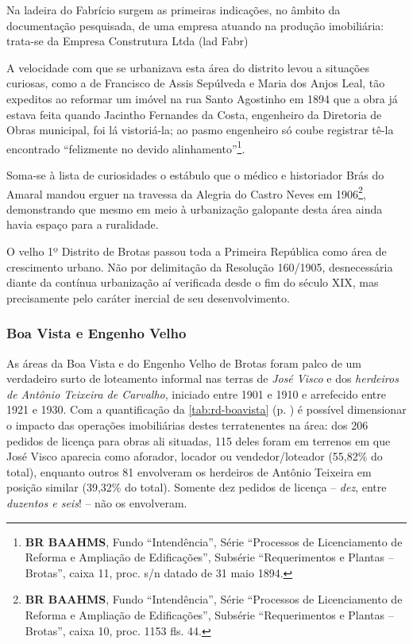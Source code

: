 
Na ladeira do Fabrício surgem as primeiras indicações, no âmbito da documentação pesquisada, de uma empresa atuando na produção imobiliária: trata-se da Empresa Construtura Ltda (lad Fabr)

A velocidade com que se urbanizava esta área do distrito levou a situações curiosas, como a de Francisco de Assis Sepúlveda e Maria dos Anjos Leal, tão expeditos ao reformar um imóvel na rua Santo Agostinho em 1894 que a obra já estava feita quando Jacintho Fernandes da Costa, engenheiro da Diretoria de Obras municipal, foi lá vistoriá-la; ao pasmo engenheiro só coube registrar tê-la encontrado ``felizmente no devido alinhamento''\footnote{\textbf{BR BAAHMS}, Fundo ``Intendência'', Série ``Processos de Licenciamento de Reforma e Ampliação de Edificações'', Subsérie ``Requerimentos e Plantas -- Brotas'', caixa 11, proc. s/n datado de 31 maio 1894.}.

Soma-se à lista de curiosidades o estábulo que o médico e historiador Brás do Amaral mandou erguer na travessa da Alegria do Castro Neves em 1906\footnote{\textbf{BR BAAHMS}, Fundo ``Intendência'', Série ``Processos de Licenciamento de Reforma e Ampliação de Edificações'', Subsérie ``Requerimentos e Plantas -- Brotas'', caixa 10, proc. 1153 fls. 44.}, demonstrando que mesmo em meio à urbanização galopante desta área ainda havia espaço para a ruralidade.


O velho 1º Distrito de Brotas passou toda a Primeira República como área de crescimento urbano. Não por delimitação da Resolução 160/1905, desnecessária diante da contínua urbanização aí verificada desde o fim do século XIX, mas precisamente pelo caráter inercial de seu desenvolvimento. 

\subsubsection{Boa Vista e Engenho Velho}


As áreas da Boa Vista e do Engenho Velho de Brotas foram palco de um verdadeiro surto de loteamento informal nas terras de \textit{José Visco} e dos \textit{herdeiros de Antônio Teixeira de Carvalho}, iniciado entre 1901 e 1910 e arrefecido entre 1921 e 1930. Com a quantificação da \autoref{tab:rd-boavista} (p. \pageref{tab:rd-boavista}) é possível dimensionar o impacto das operações imobiliárias destes terratenentes na área: dos 206 pedidos de licença para obras ali situadas, 115 deles foram em terrenos em que José Visco aparecia como aforador, locador ou vendedor/loteador (55,82\% do total), enquanto outros 81 envolveram os herdeiros de Antônio Teixeira em posição similar (39,32\% do total). Somente dez pedidos de licença – \textit{dez}, entre \textit{duzentos e seis}! – não os envolveram.

